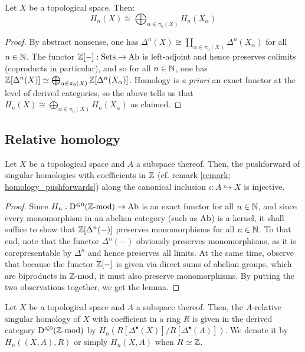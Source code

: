             \begin{proposition} \label{prop: higher_singular_homologies} 
                Let $X$ be a topological space. Then:
                    $$H_n(X) \cong \bigoplus_{\alpha \in \pi_0(X)} H_n(X_{\alpha})$$
            \end{proposition}
                \begin{proof}
                    By abstract nonsense, one has $\Delta^n(X) \cong \coprod_{\alpha \in \pi_0(X)} \Delta^n(X_{\alpha})$ for all $n \in \mathbb{N}$. The functor $\mathbb{Z}[-]: \mathrm{Sets} \to \mathrm{Ab}$ is left-adjoint and hence preserves colimits (coproducts in particular), and so for all $n \in \mathbb{N}$, one has $\mathbb{Z}[\Delta^n(X)] \simeq \bigoplus_{\alpha \in \pi_0(X)} \mathbb{Z}[\Delta^n(X_{\alpha})]$. Homology is \textit{a priori} an exact functor at the level of derived categories, so the above tells us that $H_n(X) \cong \bigoplus_{\alpha \in \pi_0(X)} H_n(X_{\alpha})$ as claimed.
                \end{proof}
            
        \subsection{Relative homology}    
            \begin{lemma}
                Let $X$ be a topological space and $A$ a subspace thereof. Then, the pushforward of singular homologies with coefficients in $\mathbb{Z}$ (cf. remark \ref{remark: homology_pushforwards}) along the canonical inclusion $\iota: A \hookrightarrow X$ is injective.
            \end{lemma}
                \begin{proof}
                    Since $H_n: \mathrm{D}^{\leqslant 0}(\mathbb{Z}\text{-}\mathrm{mod}) \to \mathrm{Ab}$ is an exact functor for all $n \in \mathbb{N}$, and since every monomorphism in an abelian category (such as $\mathrm{Ab}$) is a kernel, it shall suffice to show that $\mathbb{Z}[\Delta^n(-)]$ preserves monomorphisms for all $n \in \mathbb{N}$. To that end, note that the functor $\Delta^n(-)$ obviously preserves monomorphisms, as it is corepresentable by $\Delta^n$ and hence preserves all limits. At the same time, observe that because the functor $\mathbb{Z}[-]$ is given via direct sums of abelian groups, which are biproducts in $\mathbb{Z}\text{-}\mathrm{mod}$, it must also preserve monomorphisms. By putting the two observations together, we get the lemma.
                \end{proof}
            \begin{definition} \label{def: relative_homology}
                Let $X$ be a topological space and $A$ a subspace thereof. Then, the $A$-relative singular homology of $X$ with coefficient in a ring $R$ is given in the derived category $\mathrm{D}^{\leqslant 0}(\mathbb{Z}\text{-}\mathrm{mod})$ by $H_n(R[\Delta^{\bullet}(X)]/R[\Delta^{\bullet}(A)])$. We denote it by $H_n((X, A), R)$ or simply $H_n(X, A)$ when $R \simeq \mathbb{Z}$.
            \end{definition}
        

